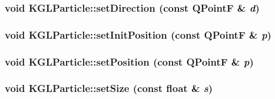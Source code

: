 \hypertarget{class_k_g_l_particle_c2e395f657d6bac641bbd4b3e34e6304}{
\subsubsection[{setDirection}]{\setlength{\rightskip}{0pt plus 5cm}void KGLParticle::setDirection (const QPointF \& {\em d})}}
\label{class_k_g_l_particle_c2e395f657d6bac641bbd4b3e34e6304}


\hypertarget{class_k_g_l_particle_28b82ab43a56e3016477e9b42c334bda}{
\subsubsection[{setInitPosition}]{\setlength{\rightskip}{0pt plus 5cm}void KGLParticle::setInitPosition (const QPointF \& {\em p})}}
\label{class_k_g_l_particle_28b82ab43a56e3016477e9b42c334bda}


\hypertarget{class_k_g_l_particle_e760126a7614c2f9e353354159125a3a}{
\subsubsection[{setPosition}]{\setlength{\rightskip}{0pt plus 5cm}void KGLParticle::setPosition (const QPointF \& {\em p})}}
\label{class_k_g_l_particle_e760126a7614c2f9e353354159125a3a}


\hypertarget{class_k_g_l_particle_7eac7336cf145c7b2f53e239d63734f4}{
\subsubsection[{setSize}]{\setlength{\rightskip}{0pt plus 5cm}void KGLParticle::setSize (const float \& {\em s})}}
\label{class_k_g_l_particle_7eac7336cf145c7b2f53e239d63734f4}



